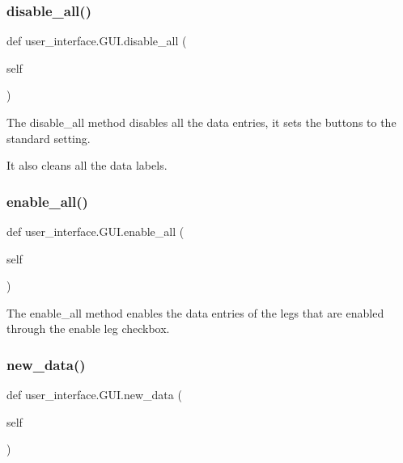 \subsubsection{\texorpdfstring{disable\+\_\+all()}{disable\_all()}}
{\footnotesize\ttfamily def user\+\_\+interface.\+G\+U\+I.\+disable\+\_\+all (\begin{DoxyParamCaption}\item[{}]{self }\end{DoxyParamCaption})}



The disable\+\_\+all method disables all the data entries, it sets the buttons to the standard setting. 

It also cleans all the data labels. \mbox{\label{classuser__interface_1_1GUI_a37f5777ca2d7aea9186d1447ada28faa}} 
\subsubsection{\texorpdfstring{enable\+\_\+all()}{enable\_all()}}
{\footnotesize\ttfamily def user\+\_\+interface.\+G\+U\+I.\+enable\+\_\+all (\begin{DoxyParamCaption}\item[{}]{self }\end{DoxyParamCaption})}



The enable\+\_\+all method enables the data entries of the legs that are enabled through the enable leg checkbox. 

\mbox{\label{classuser__interface_1_1GUI_a974d67b11bf11a3c6d30ca8ca3e86910}} 
\subsubsection{\texorpdfstring{new\+\_\+data()}{new\_data()}}
{\footnotesize\ttfamily def user\+\_\+interface.\+G\+U\+I.\+new\+\_\+data (\begin{DoxyParamCaption}\item[{}]{self }\end{DoxyParamCaption})}



